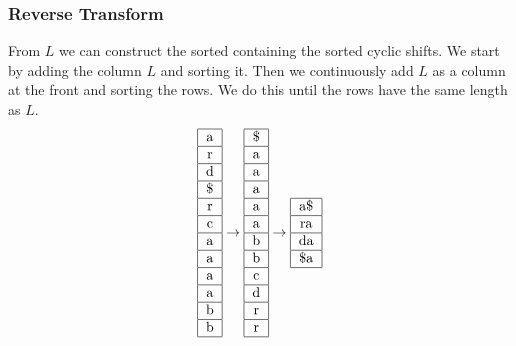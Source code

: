 \documentclass{article}
\begin{document}
\subsubsection{Reverse Transform}
From \(L\) we can construct the sorted containing the sorted cyclic shifts. We start by adding the column \(L\) and sorting it. Then we continuously add \(L\) as a column at the front and sorting the rows. We do this until the rows have the same length as \(L\). 
\begin{equation*}
    \begin{tabular}{|c|}\hline
        a \\ \hline
        r \\ \hline
        d \\ \hline
        \$ \\ \hline
        r \\ \hline
        c \\ \hline
        a \\ \hline
        a \\ \hline
        a \\ \hline
        a \\ \hline
        b \\ \hline
        b \\ \hline
    \end{tabular}
    \rightarrow
    \begin{tabular}{|c|}\hline
        \$ \\ \hline
        a \\ \hline
        a \\ \hline
        a \\ \hline
        a \\ \hline
        a \\ \hline
        b \\ \hline
        b \\ \hline
        c \\ \hline
        d \\ \hline
        r \\ \hline
        r \\ \hline
    \end{tabular}
    \rightarrow
    \begin{tabular}{|c|}\hline
        a\$ \\ \hline
        ra \\ \hline
        da \\ \hline
        \$a \\ \hline

\end{tabular}
\end{equation*}
\end{document}
